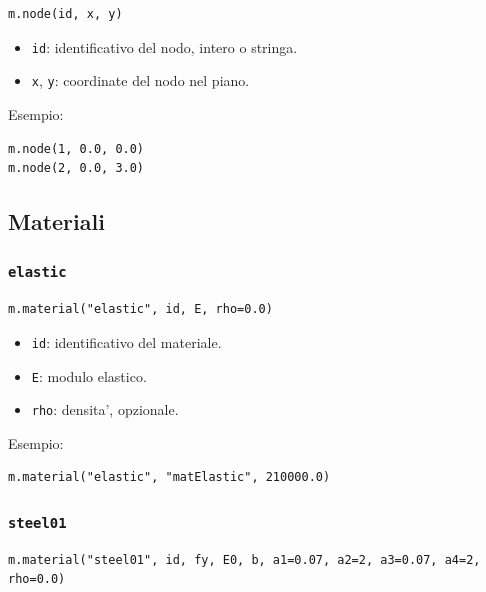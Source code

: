 \documentclass[11pt,a4paper]{article}
\begin{document}
\begin{lstlisting}[style=pythonstyle]
m.node(id, x, y)
\end{lstlisting}

\begin{itemize}
    \item \texttt{id}: identificativo del nodo, intero o stringa.
    \item \texttt{x}, \texttt{y}: coordinate del nodo nel piano.
\end{itemize}

Esempio:

\begin{lstlisting}[style=pythonstyle]
m.node(1, 0.0, 0.0)
m.node(2, 0.0, 3.0)
\end{lstlisting}

\subsection{Materiali}

\subsubsection{\texttt{elastic}}

\begin{lstlisting}[style=pythonstyle]
m.material("elastic", id, E, rho=0.0)
\end{lstlisting}

\begin{itemize}
    \item \texttt{id}: identificativo del materiale.
    \item \texttt{E}: modulo elastico.
    \item \texttt{rho}: densita', opzionale.
\end{itemize}

Esempio:

\begin{lstlisting}[style=pythonstyle]
m.material("elastic", "matElastic", 210000.0)
\end{lstlisting}

\subsubsection{\texttt{steel01}}

\begin{lstlisting}[style=pythonstyle]
m.material("steel01", id, fy, E0, b, a1=0.07, a2=2, a3=0.07, a4=2, rho=0.0)
\end{lstlisting}
\end{document}
